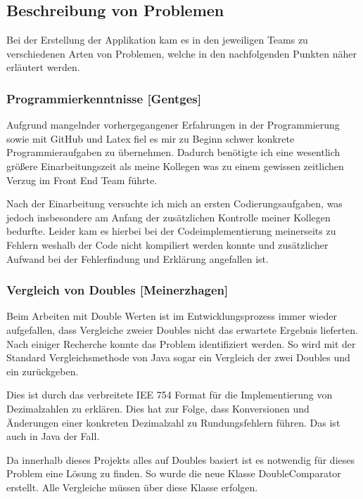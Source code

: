{\clearpage

\subsection{Beschreibung von Problemen}

Bei der Erstellung der Applikation kam es in den jeweiligen Teams zu verschiedenen Arten von Problemen, welche in den nachfolgenden Punkten näher erläutert werden.

\subsubsection{Programmierkenntnisse [Gentges]}

Aufgrund mangelnder vorhergegangener Erfahrungen in der Programmierung sowie mit GitHub und Latex fiel es mir zu Beginn schwer konkrete Programmieraufgaben zu übernehmen. Dadurch benötigte ich eine wesentlich größere Einarbeitungszeit als meine Kollegen was zu einem gewissen zeitlichen Verzug im Front End Team führte.

Nach der Einarbeitung versuchte ich mich an ersten Codierungsaufgaben, was jedoch insbesondere am Anfang der zusätzlichen Kontrolle meiner Kollegen bedurfte. 
Leider kam es hierbei bei der Codeimplementierung meinerseits zu Fehlern weshalb der Code nicht kompiliert werden konnte und zusätzlicher Aufwand bei der Fehlerfindung und Erklärung angefallen ist. 

\subsubsection{Vergleich von Doubles [Meinerzhagen]}
Beim Arbeiten mit Double Werten ist im Entwicklungsprozess immer wieder aufgefallen, dass Vergleiche zweier Doubles nicht das erwartete Ergebnis lieferten. Nach einiger Recherche konnte das Problem identifiziert werden. So wird mit der Standard Vergleichsmethode von Java sogar ein  Vergleich der zwei Doubles  und  ein  zurückgeben.

Dies ist durch das verbreitete IEE 754 Format für die Implementierung von Dezimalzahlen zu erklären. Dies hat zur Folge, dass Konversionen und Änderungen einer konkreten Dezimalzahl zu Rundungsfehlern führen. Das ist auch in Java der Fall.

Da innerhalb dieses Projekts alles auf Doubles basiert ist es notwendig für dieses Problem eine Lösung zu finden. So wurde die neue Klasse DoubleComparator erstellt. Alle Vergleiche müssen über diese Klasse erfolgen.

}
